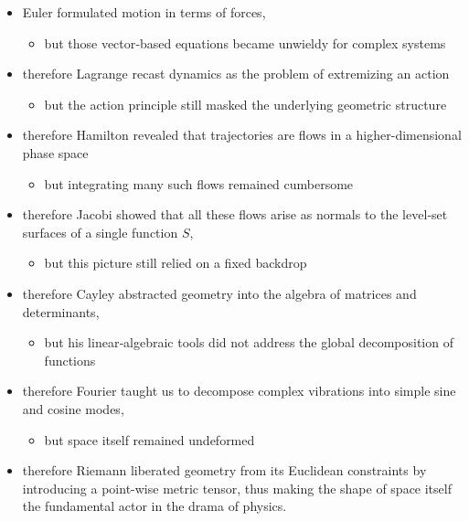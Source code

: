 \begin{itemize}
    \item Euler formulated motion in terms of forces, 
    \begin{itemize}
        \item but those vector‐based equations became unwieldy for complex systems
    \end{itemize}
    \item therefore Lagrange recast dynamics as the problem of extremizing an action
    \begin{itemize}
        \item but the action principle still masked the underlying geometric structure
    \end{itemize}
    \item therefore Hamilton revealed that trajectories are flows in a higher-dimensional phase space
    \begin{itemize}
        \item but integrating many such flows remained cumbersome
    \end{itemize}
    \item therefore Jacobi showed that all these flows arise as normals to the level‐set surfaces of a single function \(S\), 
    \begin{itemize}
        \item but this picture still relied on a fixed backdrop
    \end{itemize}
    \item therefore Cayley abstracted geometry into the algebra of matrices and determinants, 
    \begin{itemize}
        \item but his linear‐algebraic tools did not address the global decomposition of functions
    \end{itemize}
    \item therefore Fourier taught us to decompose complex vibrations into simple sine and cosine modes, 
    \begin{itemize}
        \item but space itself remained undeformed
    \end{itemize}
    \item therefore Riemann liberated geometry from its Euclidean constraints by introducing a point-wise metric tensor, thus making the shape of space itself the fundamental actor in the drama of physics.  
\end{itemize}



